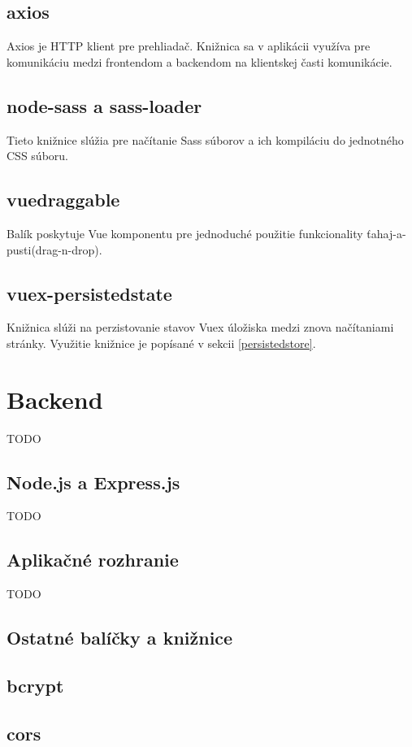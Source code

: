 \subsection*{axios}
Axios je HTTP klient pre prehliadač. Knižnica sa v aplikácii využíva pre komunikáciu medzi frontendom a backendom na klientskej časti komunikácie. 

\subsection*{node-sass a sass-loader}
Tieto knižnice slúžia pre načítanie Sass súborov a ich kompiláciu do jednotného CSS súboru.

\subsection*{vuedraggable}
Balík poskytuje Vue komponentu pre jednoduché použitie funkcionality ťahaj-a-pusti(drag-n-drop).

\subsection*{vuex-persistedstate}
Knižnica slúži na perzistovanie stavov Vuex úložiska medzi znova načítaniami stránky. Využitie knižnice je popísané v sekcii \ref{persistedstore}.

\section{Backend}
TODO

\subsection{Node.js a Express.js}
\label{node}
TODO

\subsection{Aplikačné rozhranie}
TODO

\subsection{Ostatné balíčky a knižnice}
\subsection*{bcrypt}

\subsection*{cors}

